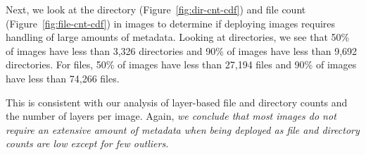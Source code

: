 Next, we look at the directory (Figure~\ref{fig:dir-cnt-cdf}) and file count
(Figure~\ref{fig:file-cnt-cdf}) in images to determine if deploying images requires
handling of large amounts of metadata. 
Looking at directories, we see that 50\% of images have less than 3,326 directories and 90\% of images have less than
9,692 directories. %
For
files, 50\% of images have less than 27,194 files and 90\% of images have less than 74,266 files.

This is consistent with our analysis of layer-based file and directory counts
and the number of layers per image. Again, \textit{we conclude that most images do not
require an extensive amount of metadata when being deployed as file and
directory counts are low except for few outliers.}


%

